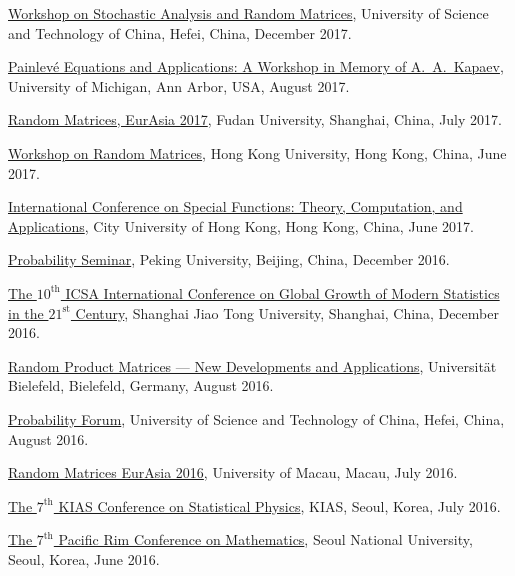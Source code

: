 \begin{item_list}
\item
  \href{http://wulab.ustc.edu.cn/bencandy.php?fid=61&id=1688}{Workshop on Stochastic Analysis and Random Matrices}, University of Science and Technology of China, Hefei, China, December 2017.
\item
  \href{https://lsa.umich.edu/math/centers-outreach/mcaim/painleve-equations-workshop--august-25-29--2017.html}{Painlev\'{e} Equations and Applications: A Workshop in Memory of A.~A.~Kapaev}, University of Michigan, Ann Arbor, USA, August 2017.
\item
  \href{http://www.fst.umac.mo/en/staff/documents/yayangchen/Workshop%20on%20RMT17.pdf}{Random Matrices, EurAsia 2017}, Fudan University, Shanghai, China, July 2017.
\item
  \href{http://hkumath.hku.hk/~imr/records1617/Workshop%20on%20Random%20Matrices_2017Jun16.pdf}{Workshop on Random Matrices}, Hong Kong University, Hong Kong, China, June 2017.
\item 
  \href{http://www6.cityu.edu.hk/rcms/icsf2017/index.htm}{International Conference on Special Functions: Theory, Computation, and Applications}, City University of Hong Kong, Hong Kong, China, June 2017.
\item
  \href{http://www.math.pku.edu.cn/teachers/liuyong/seminar/wangdong2016.pdf}{Probability Seminar}, Peking University, Beijing, China, December 2016.
\item
  \href{http://www.math.sjtu.edu.cn/conference/2016icsa/}{The $10^{\text{th}}$ ICSA International Conference on Global Growth of Modern Statistics in the $21^{\text{st}}$ Century}, Shanghai Jiao Tong University, Shanghai, China, December 2016.
\item
  \href{https://www2.physik.uni-bielefeld.de/rpm_2016.html}{Random Product Matrices --- New Developments and Applications}, Universit\"{a}t Bielefeld, Bielefeld, Germany, August 2016.
\item
  \href{http://home.ustc.edu.cn/~shanamy3/index.html}{Probability Forum}, University of Science and Technology of China, Hefei, China, August 2016.
\item
  \href{http://www.fst.umac.mo/conference/RandomMatricesEurAsia2016/Abstracts/Blower_abstract.pdf}{Random Matrices EurAsia 2016}, University of Macau, Macau, July 2016.
\item 
  \href{http://home.kias.re.kr/psec/nspcs16/}{The $7^{\text{th}}$ KIAS Conference on Statistical Physics}, KIAS, Seoul, Korea, July 2016.
\item
  \href{http://prcm.math.snu.ac.kr/}{The $7^{\text{th}}$ Pacific Rim Conference on Mathematics}, Seoul National University, Seoul, Korea, June 2016.

\end{item_list}

